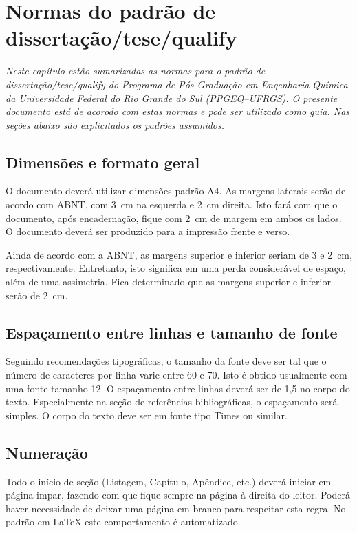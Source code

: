 %
%
%
\chapter{Normas do padrão de dissertação/tese/qualify} \label{chap:normas}


\emph{Neste capítulo estão sumarizadas as normas para o padrão de dissertação/tese/qualify
do Programa de Pós-Graduação em Engenharia Química da Universidade Federal do Rio Grande
do Sul (PPGEQ--UFRGS).
O presente documento está de acorodo com estas normas e pode ser utilizado como guia.
Nas seções abaixo são explicitados os padrões assumidos.}

\section{Dimensões e formato geral}

O documento deverá utilizar dimensões padrão A4.
As margens laterais serão de acordo com ABNT, com 3~cm na esquerda e 2~cm direita.
Isto fará com que o documento, após encadernação, fique com 2~cm de margem em
ambos os lados.
O documento deverá ser produzido para a impressão frente e verso.

Ainda de acordo com a ABNT, as margens superior e inferior seriam de 3 e 2~cm, respectivamente.
Entretanto, isto significa em uma perda considerável de espaço, além de uma assimetria.
Fica determinado que as margens superior e inferior serão de 2~cm.

\section{Espaçamento entre linhas e tamanho de fonte}

Seguindo recomendações tipográficas, o tamanho da fonte deve ser tal que o número de caracteres
por linha varie entre 60 e 70. Isto é obtido usualmente com uma fonte tamanho 12.
O espaçamento entre linhas deverá ser de 1,5 no corpo do texto.
Especialmente na seção de referências bibliográficas, o espaçamento será simples.
O corpo do texto deve ser em fonte tipo Times ou similar.

\section{Numeração}

Todo o início de seção (Listagem, Capítulo, Apêndice, etc.) deverá iniciar em página impar,
fazendo com que fique sempre na página à direita do leitor.
Poderá haver necessidade de deixar uma página em branco para respeitar esta regra.
No padrão em \LaTeX{} este comportamento é automatizado. 

